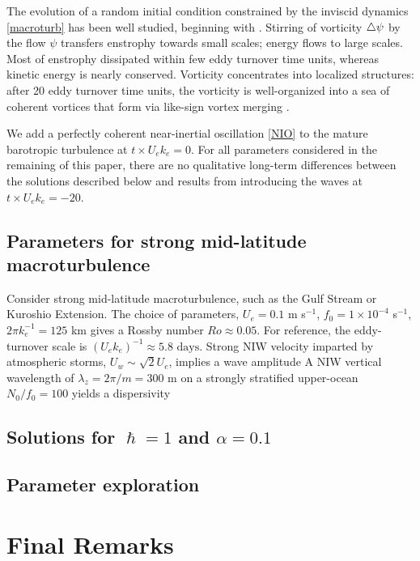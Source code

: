 \documentclass{jfm}
\begin{document}
 The evolution of a random initial condition constrained by the inviscid
 dynamics \eqref{macroturb} has been well studied, beginning with \cite{fornberg1977}.
 Stirring of vorticity $\triangle \psi$ by the flow $\psi$ transfers enstrophy towards
 small scales; energy flows to large
 scales. Most of enstrophy dissipated within few eddy turnover time units, whereas
 kinetic energy is nearly conserved. Vorticity concentrates into localized
 structures: after 20 eddy turnover time units, the vorticity is well-organized
 into a sea of coherent vortices that form via like-sign vortex merging
 \citep[e.g., ][]{mcwilliams1984}.

 We add a perfectly coherent near-inertial oscillation \eqref{NIO} to the mature
 barotropic turbulence at $t \times U_e k_e = 0$. For all parameters considered
 in the remaining of this paper, there are no qualitative long-term differences
 between the solutions described below and results from introducing the waves
 at $t\times U_e k_e = -20$.



\subsection{Parameters for strong mid-latitude macroturbulence}

Consider strong mid-latitude macroturbulence, such as the Gulf Stream or Kuroshio
Extension. The choice of parameters, $U_e = 0.1$ m s$^{-1}$,
$f_0 = 1 \times 10^{-4}$ s$^{-1}$, $2\pi k_e^{-1} = 125$ km
gives a Rossby number $Ro \approx  0.05$. For reference, the eddy-turnover scale
is $(U_e k_e)^{-1}\approx 5.8\,\,\text{days}$. Strong NIW velocity imparted by
atmospheric storms, $U_w \sim \sqrt{2} U_e$, implies a wave amplitude
\beq
  \alpha {}\per
\eeq
A NIW vertical wavelength of $\lambda_z = 2\pi/m = 300$ m \citep[e.g., ][]{alford_etal2016}
on a strongly stratified upper-ocean $N_0/f_0 = 100$ yields a dispersivity
\beq
  \hslash {} \per
\eeq

\subsection{Solutions for $\hslash = 1$ and $\alpha = 0.1$}

\subsection{Parameter exploration}

\section{Final Remarks}
\end{document}
